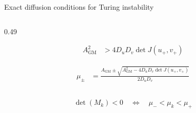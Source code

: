 \begin{frame}{Exact diffusion conditions for Turing instability}
\begin{columns}[T,onlytextwidth]
\begin{column}{0.49\textwidth}
      \vspace{-0.40cm}

      {\color{HydraWhite}\fontsize{9.2}{11.7}\selectfont
      \begin{align*}
        A_{\mathrm{GM}}^2
        &>
        4D_uD_v\det J(u_+,v_+)
      \end{align*}
      }

      \vspace{-0.98cm}

      {\color{HydraWhite}\fontsize{8.2}{10.4}\selectfont
      \begin{align*}
        \mu_\pm
        &=
        \frac{
          A_{\mathrm{GM}}
          \pm
          \sqrt{
            A_{\mathrm{GM}}^2
            -
            4D_uD_v\det J(u_+,v_+)
          }
        }{
          2D_uD_v
        }
      \end{align*}
      }

    \end{column}

  \end{columns}

  \vspace{-0.36cm}

  {\color{HydraGold}\bfseries\fontsize{9.2}{11.7}\selectfont
  \begin{align*}
    \det(M_k)<0
    \quad\Longleftrightarrow\quad
    \mu_-<\mu_k<\mu_+
  \end{align*}
  }

\end{frame}


